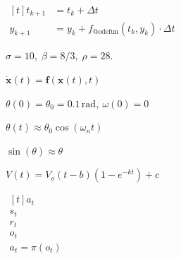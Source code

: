 \documentclass[multi={mymath,myarray},border=1pt]{standalone}
\newenvironment{mymath}{$\displaystyle}{$}
\newenvironment{myarray}{$\begin{aligned}[t]}{\end{aligned}$}
\begin{document}
\begin{myarray}
  t_{k+1} &= t_{k} + \Delta t &\\
  y_{k+1} &= y_k + f_{\text{@odefun}}(t_k, y_k) \cdot \Delta t
\end{myarray}

\begin{mymath}
  \sigma = 10, \; \beta = 8/3, \; \rho = 28 .
\end{mymath}

\begin{mymath}
  \mathbf{\dot{x}}(t) = \mathbf{f}(\mathbf{x}(t), t)
\end{mymath}

\begin{mymath}
  \theta(0) = \theta_0 = 0.1 \, \text{rad}, \: \omega(0) = 0
\end{mymath}

\begin{mymath}
  \theta(t) \approx \theta_0 \cos(\omega_n t)
\end{mymath}

\begin{mymath}
\sin(\theta) \approx \theta
\end{mymath}

\begin{mymath}
  V(t) = V_o (t-b)(1-e^{-kt})+c
\end{mymath}

\begin{myarray}
  a_t \\
  s_t \\
  r_t \\
  o_t \\
  a_t = \pi(o_t)
\end{myarray}
\end{document}
